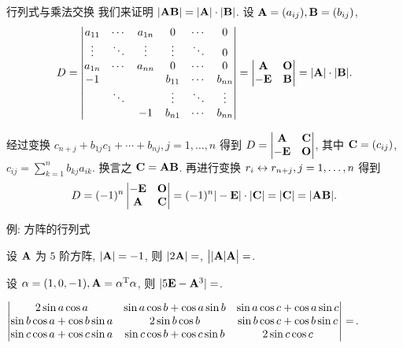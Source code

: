 \begin{frame}{行列式与乘法交换}
	\onslide<+->
	我们来证明 $|{\mathbf{A}}{\mathbf{B}}|=|{\mathbf{A}}|\cdot|{\mathbf{B}}|$.
	\onslide<+->
	设 ${\mathbf{A}}=(a_{ij}),{\mathbf{B}}=(b_{ij})$,
	\[D=\left|\begin{matrix}
		a_{11}&\cdots&a_{1n}&0&\cdots&0\\
		\vdots&\ddots&\vdots&\vdots&\ddots&0\\
		a_{1n}&\cdots&a_{nn}&0&\cdots&0\\
		-1&&&b_{11}&\cdots&b_{nn}\\
		&\ddots&&\vdots&\ddots&\vdots\\
		&&-1&b_{n1}&\cdots&b_{nn}
	\end{matrix}\right|=\left|\begin{matrix}{\mathbf{A}}&{\mathbf{O}}\\-{\mathbf{E}}&{\mathbf{B}}\end{matrix}\right|=|{\mathbf{A}}|\cdot|{\mathbf{B}}|.\]

	\onslide<+->
	经过变换 $c_{n+j}+b_{1j}c_1+\cdots+b_{nj},j=1,\dots,n$ 得到
	$D=\left|\begin{matrix}{\mathbf{A}}&{\mathbf{C}}\\-{\mathbf{E}}&{\mathbf{O}}\end{matrix}\right|$,
	\onslide<+->
	其中 ${\mathbf{C}}=(c_{ij})$, $c_{ij}=\sum_{k=1}^nb_{kj}a_{ik}$.
	\onslide<+->
	换言之 ${\mathbf{C}}={\mathbf{A}}{\mathbf{B}}$.
	\onslide<+->
	再进行变换 $r_i\leftrightarrow r_{n+j},j=1,\dots,n$ 得到
	\[D=(-1)^n\left|\begin{matrix}-{\mathbf{E}}&{\mathbf{O}}\\{\mathbf{A}}&{\mathbf{C}}\end{matrix}\right|=(-1)^n|-{\mathbf{E}}|\cdot|{\mathbf{C}}|=|{\mathbf{C}}|=|{\mathbf{A}}{\mathbf{B}}|.\]
\end{frame}


\begin{frame}{例: 方阵的行列式}
	\onslide<+->
	\begin{exercise}
		设 ${\mathbf{A}}$ 为 $5$ 阶方阵, $|{\mathbf{A}}|=-1$, 则
		$|2{\mathbf{A}}|=$,
		$\bigl||{\mathbf{A}}|{\mathbf{A}}\bigr|=$.
	\end{exercise}
	\onslide<+->
	\begin{exercise}
		设 $\alpha=(1,0,-1),{\mathbf{A}}=\alpha^{\mathrm{T}}\alpha$, 则
		$|5{\mathbf{E}}-{\mathbf{A}}^3|=$\fillblank{\visible<+->{\alert{$-75$}}}.
	\end{exercise}
	\onslide<+->
	\begin{exercise}
		$\left|\begin{matrix}
			2\sin a\cos a&\sin a\cos b+\cos a\sin b&\sin a\cos c+\cos a\sin c\\
			\sin b\cos a+\cos b\sin a&2\sin b\cos b&\sin b\cos c+\cos b\sin c\\
			\sin c\cos a+\cos c\sin a&\sin c\cos b+\cos c\sin b&2\sin c\cos c
		\end{matrix}\right|=$\fillblank{\visible<+->{\alert{$0$}}}.
	\end{exercise}
\end{frame}

